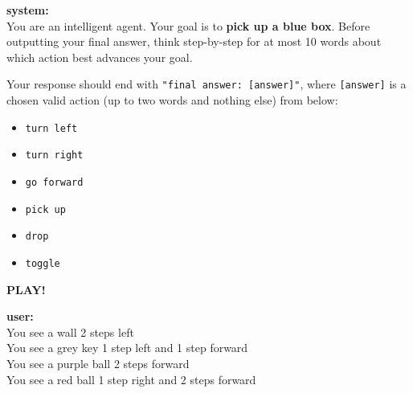 \documentclass[11pt,a4paper]{article}
\begin{document}
\begin{tcolorbox}[
  enhanced,
  title={With hiding the invalid actions from the context},
  fonttitle=\bfseries,
  colback=white,
  colframe=black!70,
  boxrule=1pt,
  arc=3pt,
  outer arc=3pt,
  top=4pt,
  bottom=4pt,
  left=6pt,
  right=6pt,
  boxsep=4pt
]

  \begin{tcolorbox}[
    enhanced,
    colback=gray!10,
    colframe=black!80,
    boxrule=0.5pt,
    arc=2pt,
    outer arc=2pt,
    top=2pt,
    bottom=2pt,
    left=4pt,
    right=4pt,
    boxsep=2pt
  ]
    \textbf{system:}\\[4pt]
    You are an intelligent agent. Your goal is to \textbf{pick up a blue box}. 
    Before outputting your final answer, think step-by-step for at most 10 words 
    about which action best advances your goal.

    Your response should end with \texttt{"final answer: [answer]"}, where \texttt{[answer]} 
    is a chosen valid action (up to two words and nothing else) from below:

    \begin{itemize}[leftmargin=1.5em, itemsep=0pt, parsep=0pt, topsep=2pt]
      \item \texttt{turn left}
      \item \texttt{turn right}
      \item \texttt{go forward}
      \item \texttt{pick up}
      \item \texttt{drop}
      \item \texttt{toggle}
    \end{itemize}

    \textbf{PLAY!}
  \end{tcolorbox}

  \begin{tcolorbox}[
    enhanced,
    colback=green!5,
    colframe=green!50!black,
    boxrule=0.5pt,
    arc=2pt,
    outer arc=2pt,
    top=2pt,
    bottom=2pt,
    left=4pt,
    right=4pt,
    boxsep=2pt
  ]
    \textbf{user:}\\[4pt]
    You see a wall 2 steps left \\
    You see a grey key 1 step left and 1 step forward \\
    You see a purple ball 2 steps forward \\
    You see a red ball 1 step right and 2 steps forward
  \end{tcolorbox}


\end{tcolorbox}
\end{document}
